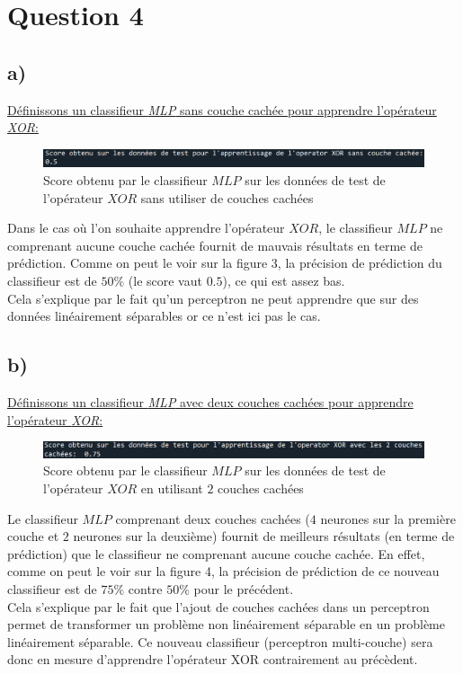 \documentclass[frenchb]{report}
\newcommand{\1}{\mathbbm{1}}
\theoremstyle{definition}\newtheorem{defn}{Définition}
\theoremstyle{definition}\newtheorem{exm}{Exemple}
\theoremstyle{definition}\newtheorem{nota}{Notation}
\theoremstyle{definition}\newtheorem{rem}{Remarque}
\begin{document}
\section*{Question 4}
\subsection{a)}

\underline{Définissons un classifieur \textit{MLP} sans couche cachée pour apprendre l’opérateur \textit{XOR}:}

\begin{figure}[H]
	\centering
	\includegraphics[scale=0.7]{images/Q4a.png}
	\caption{Score obtenu par le classifieur $MLP$ sur les données de test de l'opérateur $XOR$ sans utiliser de couches cachées}
\end{figure}
Dans le cas où l'on souhaite apprendre l'opérateur $XOR$, le classifieur $MLP$ ne comprenant aucune couche cachée fournit de mauvais résultats en terme de prédiction. Comme on peut le voir sur la figure 3, la précision de prédiction du classifieur est de $50\%$ (le score vaut $0.5$), ce qui est assez bas.\\
Cela s'explique par le fait qu'un perceptron ne peut apprendre que sur des données linéairement séparables or ce n'est ici pas le cas.

\subsection{b)}

\underline{Définissons un classifieur \textit{MLP} avec deux couches cachées pour apprendre l’opérateur \textit{XOR}:}


\begin{figure}[H]
	\centering
	\includegraphics[scale=0.7]{images/Q4b.png}
	\caption{Score obtenu par le classifieur $MLP$ sur les données de test de l'opérateur $XOR$ en utilisant $2$ couches cachées}
\end{figure}
Le classifieur $MLP$ comprenant deux couches cachées ($4$ neurones sur la première couche et $2$ neurones sur la deuxième) fournit de meilleurs résultats (en terme de prédiction) que le classifieur ne comprenant aucune couche cachée. En effet, comme on peut le voir sur la figure 4, la précision de prédiction de ce nouveau classifieur est de $75\%$ contre $50\%$ pour le précédent.\\
Cela s'explique par le fait que l'ajout de couches cachées dans un perceptron permet de transformer un problème non linéairement séparable en un problème linéairement séparable. Ce nouveau classifieur (perceptron multi-couche) sera donc en mesure d'apprendre l'opérateur XOR contrairement au précèdent.
\end{document}
